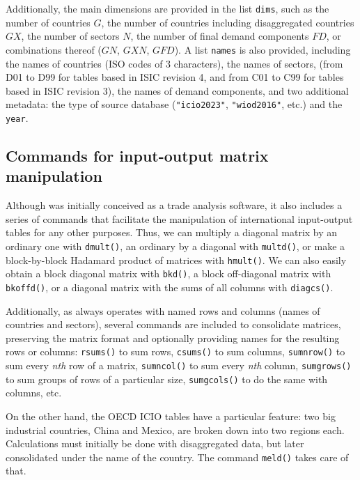 Additionally, the main dimensions are provided in the list \texttt{dims},
such as the number of countries \(G\), the number of countries including
disaggregated countries \(GX\), the number of sectors \(N\), the number of final
demand components \(FD\), or combinations thereof (\(GN\), \(GXN\), \(GFD\)). A list
\texttt{names} is also provided, including the names of countries (ISO codes of
3 characters), the names of sectors, (from D01 to D99 for tables based in ISIC
revision 4, and from C01 to C99 for tables based in ISIC revision 3), the
names of demand components, and two additional metadata: the type of source
database (\texttt{"icio2023"}, \texttt{"wiod2016"}, etc.) and the \texttt{year}.

\hypertarget{commands-for-input-output-matrix-manipulation}{%
\subsection{Commands for input-output matrix manipulation}\label{commands-for-input-output-matrix-manipulation}}

Although  was initially conceived as a trade analysis
software, it also includes a series of commands that facilitate the manipulation
of international input-output tables for any other purposes. Thus, we can
multiply a diagonal matrix by an ordinary one with \texttt{dmult()}, an ordinary by a
diagonal with \texttt{multd()}, or make a block-by-block Hadamard product of matrices
with \texttt{hmult()}. We can also easily obtain a block diagonal matrix with \texttt{bkd()},
a block off-diagonal matrix with \texttt{bkoffd()}, or a diagonal matrix with the sums
of all columns with \texttt{diagcs()}.

Additionally, as  always operates with named rows and columns
(names of countries and sectors), several commands are included to consolidate
matrices, preserving the matrix format and optionally providing names for the
resulting rows or columns: \texttt{rsums()} to sum rows, \texttt{csums()} to sum columns,
\texttt{sumnrow()} to sum every \emph{nth} row of a matrix, \texttt{sumncol()} to sum every \emph{nth}
column, \texttt{sumgrows()} to sum groups of rows of a particular size, \texttt{sumgcols()} to
do the same with columns, etc.

On the other hand, the OECD ICIO tables have a particular feature: two big
industrial countries, China and Mexico, are broken down into two regions each.
Calculations must initially be done with disaggregated data, but later
consolidated under the name of the country. The command \texttt{meld()} takes
care of that.

